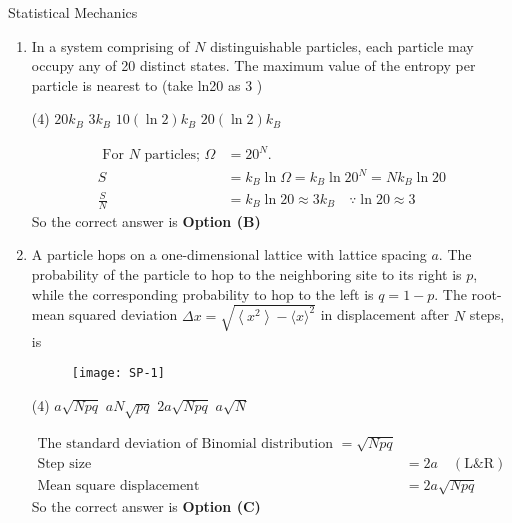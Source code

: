 \begin{abox}
	Statistical Mechanics 
	\end{abox}
\begin{enumerate}
\item In a system comprising of $N$ distinguishable particles, each particle may occupy any of 20 distinct states. The maximum value of the entropy per particle is nearest to (take ln20 as 3 )
\begin{tasks}(4)
\task[\textbf{A.}] $20 k_{B}$
\task[\textbf{B.}]  $3 k_{B}$
\task[\textbf{C.}] $10(\ln 2) k_{B}$
\task[\textbf{D.}] $20(\ln 2) k_{B}$
\end{tasks}
\begin{answer}
$$\begin{aligned}
\text{	For $N$ particles; }\Omega&=20^{N} .\\
S&=k_{B} \ln \Omega=k_{B} \ln 20^{N}=N k_{B} \ln 20 \\ \frac{S}{N}&=k_{B} \ln 20 \approx 3 k_{B} \quad \because \ln 20 \approx 3
\end{aligned}$$
So the correct answer is \textbf{Option (B)}
\end{answer}
	\item A particle hops on a one-dimensional lattice with lattice spacing $a$. The probability of the particle to hop to the neighboring site to its right is $p$, while the corresponding probability to hop to the left is $q=1-p$. The root-mean squared deviation $\Delta x=\sqrt{\left\langle x^{2}\right\rangle-\langle x\rangle^{2}}$ in displacement after $N$ steps, is
\begin{figure}[H]
\centering
\texttt{[image: SP-1]}
\end{figure}
\begin{tasks}(4)
\task[\textbf{A.}] $a \sqrt{N p q}$
\task[\textbf{B.}] $a N \sqrt{p q}$
\task[\textbf{C.}] $2 a \sqrt{N p q}$
\task[\textbf{D.}] $a \sqrt{N}$
\end{tasks}
\begin{answer}
$$\begin{aligned}	
\text{The standard deviation of Binomial distribution $=\sqrt{N p q}$}\\
\text{Step size } &=2 a\quad (\mathrm{L} \& \mathrm{R})\\
\text{Mean square displacement }&=2 a \sqrt{N p q}
\end{aligned}$$	
So the correct answer is \textbf{Option (C)}
\end{answer}


\end{enumerate}
